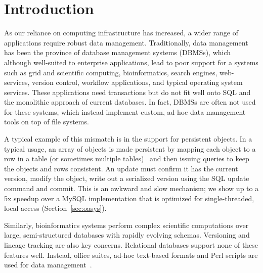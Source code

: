 \documentclass[letterpaper,twocolumn,10pt]{article}
\begin{document}




\section{Introduction}

As our reliance on computing infrastructure has increased, a wider range of 
applications require robust data management.  Traditionally, data management
has been the province of database management systems (DBMSs), which although
well-suited to enterprise applications, lead to poor support for a
systems such as grid and scientific computing,
bioinformatics, search engines, web-services, version control, workflow
applications, and typical operating system services.  These applications 
need transactions but do not fit well
onto SQL and the monolithic approach of current databases.  In
fact, DBMSs are often not used for these systems, which instead
implement custom, ad-hoc data management tools on top of file
systems.

A typical example of this mismatch is in the support for
persistent objects.
In a typical usage, an array of objects is made persistent by
mapping each object to a row in a table (or sometimes multiple
tables)~\cite{hibernate} and then issuing queries to keep the objects and
rows consistent. An update must confirm it has the current
version, modify the object, write out a serialized version using the
SQL update command and commit. This is an awkward and slow mechanism;
we show up to a 5x speedup over a MySQL implementation that is
optimized for single-threaded, local access (Section~\ref{sec:oasys}).

Similarly, bioinformatics systems perform complex scientific
computations over large, semi-structured databases with rapidly evolving schemas.  Versioning and
lineage tracking are also key concerns.  Relational databases support
none of these features well.  Instead, office suites, ad-hoc
text-based formats and Perl scripts are used for data management~\cite{perl, excel}.
\end{document}
